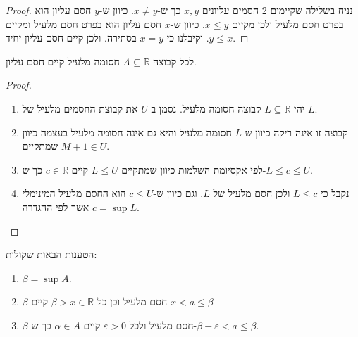 \documentclass{tstextbook}
\begin{document}
\begin{proof}
נניח בשלילה שקיימים 2 חסמים עליונים \(x,y\) כך ש-\(x\neq y\). כיוון ש-\(y\) חסם עליון הוא בפרט חסם מלעיל ולכן מקיים \(x\leq y\). כיוון ש-\(x\) חסם עליון הוא בפרט חסם מלעיל ומקיים \(y\leq x\). וקיבלנו כי \(x=y\) בסתירה. ולכן קיים חסם עליון יחיד.

\end{proof}
\begin{theorem}
לכל קבוצה \(A\subseteq \mathbb{R}\) חסומה מלעיל קיים חסם עליון.

\end{theorem}
\begin{proof}
  \begin{enumerate}
    \item יהי \(L\subseteq \mathbb{R}\) קבוצה חסומה מלעיל. נסמן ב-\(U\) את קבוצת החסמים מלעיל של \(L\). 


    \item קבוצה זו אינה ריקה כיוון ש-\(L\) חסומה מלעיל והיא גם אינה חסומה מלעיל בעצמה כיוון שמתקיים \(M+1 \in U\). 


    \item לפי אקסיומת השלמות כיוון שמתקיים \(L\leq U\) קיים \(c \in \mathbb{R}\) כך ש-\(L\leq c\leq U\). 


    \item נקבל כי \(L\leq c\) ולכן חסם מלעיל של \(L\). וגם כיוון ש-\(c\leq U\) הוא החסם מלעיל המינימלי אשר לפי ההגדרה \(c=\sup L\). 


  \end{enumerate}
\end{proof}
\begin{proposition}
הטענות הבאות שקולות:

  \begin{enumerate}
    \item \(\beta=\sup A\). 


    \item \(\beta\) חסם מלעיל וכן כל \(\beta > x \in\mathbb{R}\) קיים \(x<a \leq \beta\)


    \item \(\beta\) חסם מלעיל ולכל \(\varepsilon>0\) קיים \(\alpha \in A\) כך ש-\(\beta-\varepsilon < a\leq \beta\). 


  \end{enumerate}
\end{proposition}
\end{document}
